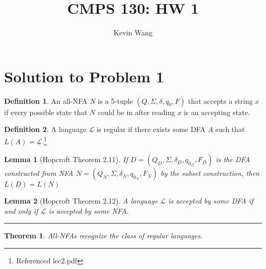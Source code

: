 \documentclass[11pt]{report}
\title{CMPS 130: HW 1}
\author{Kevin Wang}
\newcounter{problem}
\theoremstyle{definition}
\newtheorem{definition}{Definition}[problem]
\theoremstyle{plain}
\newtheorem{lemma}{Lemma}[problem]
\theoremstyle{plain}
\newtheorem{theorem*}{Theorem}
\begin{document}
\maketitle

\section*{Solution to Problem 1}

\begin{definition}
An all-NFA $N$ is a 5-tuple $(Q,\Sigma,\delta,q_{0},F)$ that accepts a string $x$ if every possible state that $N$ could be in after reading $x$ is an accepting state.
\end{definition}

\begin{definition}
A language $\mathcal{L}$ is regular if there exists some DFA $A$ such that $L(A)=\mathcal{L}$.\footnote{Referenced lec2.pdf}
\end{definition}

\begin{lemma}[Hopcroft Theorem 2.11]
If $D=(Q_{D},\Sigma,\delta_{D},q_{0_{D}},F_{D})$ is the DFA constructed from NFA $N=(Q_{N},\Sigma,\delta_{N},q_{0_{N}},F_{N})$ by the subset construction, then $L(D)=L(N)$
\end{lemma}

\begin{lemma}[Hopcroft Theorem 2.12]
A language $\mathcal{L}$ is accepted by some DFA if and only if $\mathcal{L}$ is accepted by some NFA.
\end{lemma}

\hrule

\begin{theorem*}
All-NFAs recognize the class of regular languages.
\end{theorem*}
\end{document}
